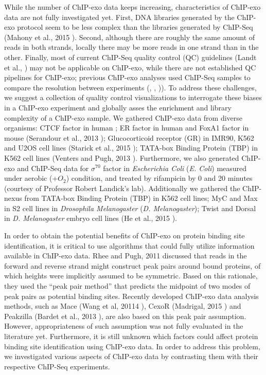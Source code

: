 \documentclass{bmcart}\usepackage[]{graphicx}\usepackage[]{color}
\newcommand{\sig}{\sigma^{70}}
\begin{document}
While the number of ChIP-exo data keeps increasing, characteristics of
ChIP-exo data are not fully investigated yet. First, DNA libraries
generated by the ChIP-exo protocol seem to be less complex than the
libraries generated by ChIP-Seq (Mahony et al., 2015
\cite{exo_review}). Second, although there are roughly the same amount
of reads in both strands, locally there may be more reads in one
strand than in the other. Finally, most of current ChIP-Seq quality
control (QC) guidelines (Landt et al., \cite{encode_qc}) may not be
applicable on ChIP-exo, while there are not established QC pipelines
for ChIP-exo; previous ChIP-exo analyses used ChIP-Seq samples to
compare the resolution between experiments (\cite{exo1},
\cite{exoillumina}, \cite{exo2})). To address these challenges, we
suggest a collection of quality control visualizations to interrogate
these biases in a ChIP-exo experiment and globally asses the
enrichment and library complexity of a ChIP-exo sample. We gathered
ChIP-exo data from diverse organisms: CTCF factor in human
\cite{exo1}; ER factor in human and FoxA1 factor in mouse (Serandour
et al., 2013 \cite{exoillumina}); Glucocorticoid receptor (GR) in
IMR90, K562 and U2OS cell lines (Starick et al., 2015
\cite{starick15}); TATA-box Binding Protein (TBP) in K562 cell lines
(Venters and Pugh, 2013 \cite{venters13}). Furthermore, we also
generated ChIP-exo and ChIP-Seq data for $\sig$ factor in
\emph{Escherichia Coli} (\emph{E. Coli}) measured under aerobic ($ +
O_2$) condition, and treated by rifampicin by 0 and 20 minutes
(courtesy of Professor Robert Landick's lab). Additionally we gathered
the ChIP-nexus from TATA-box Binding Protein (TBP) in K562 cell lines;
MyC and Max in S2 cell lines in \emph{Drosophila Melanogaster}
(\emph{D. Melanogaster}); Twist and Dorsal in \emph{D. Melanogaster}
embryo cell lines (He et al., 2015 \cite{chipnexus}).

In order to obtain the potential benefits of ChIP-exo on protein
binding site identification, it is critical to use algorithms that
could fully utilize information available in ChIP-exo data. Rhee and
Pugh, 2011 \cite{exo1} discussed that reads in the forward and reverse
strand might construct peak pairs around bound proteins, of which
heights were implicitly assumed to be symmetric. Based on this
rationale, they used the ``peak pair method'' that predicts the
midpoint of two modes of peak pairs as potential binding
sites. Recently developed ChIP-exo data analysis methods, such as Mace
(Wang et al, 20114 \cite{mace}), CexoR (Madrigal, 2015 \cite{cexor})
and Peakzilla (Bardet et al., 2013 \cite{peakzilla}), are also based
on this peak pair assumption. However, appropriateness of such
assumption was not fully evaluated in the literature yet. Furthermore,
it is still unknown which factors could affect protein binding site
identification using ChIP-exo data. In order to address this problem,
we investigated various aspects of ChIP-exo data by contrasting them
with their respective ChIP-Seq experiments.
\end{document}

